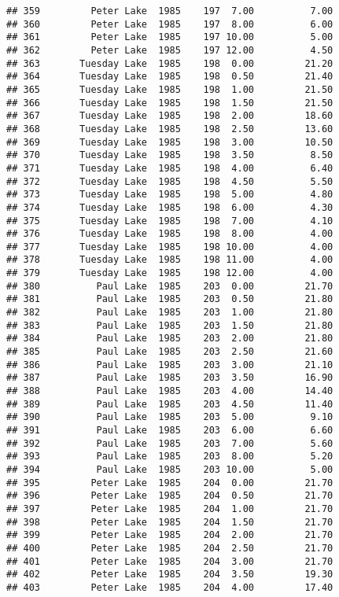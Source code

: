 \documentclass[
]{article}
\begin{document}
\begin{verbatim}
## 359         Peter Lake  1985    197  7.00          7.00
## 360         Peter Lake  1985    197  8.00          6.00
## 361         Peter Lake  1985    197 10.00          5.00
## 362         Peter Lake  1985    197 12.00          4.50
## 363       Tuesday Lake  1985    198  0.00         21.20
## 364       Tuesday Lake  1985    198  0.50         21.40
## 365       Tuesday Lake  1985    198  1.00         21.50
## 366       Tuesday Lake  1985    198  1.50         21.50
## 367       Tuesday Lake  1985    198  2.00         18.60
## 368       Tuesday Lake  1985    198  2.50         13.60
## 369       Tuesday Lake  1985    198  3.00         10.50
## 370       Tuesday Lake  1985    198  3.50          8.50
## 371       Tuesday Lake  1985    198  4.00          6.40
## 372       Tuesday Lake  1985    198  4.50          5.50
## 373       Tuesday Lake  1985    198  5.00          4.80
## 374       Tuesday Lake  1985    198  6.00          4.30
## 375       Tuesday Lake  1985    198  7.00          4.10
## 376       Tuesday Lake  1985    198  8.00          4.00
## 377       Tuesday Lake  1985    198 10.00          4.00
## 378       Tuesday Lake  1985    198 11.00          4.00
## 379       Tuesday Lake  1985    198 12.00          4.00
## 380          Paul Lake  1985    203  0.00         21.70
## 381          Paul Lake  1985    203  0.50         21.80
## 382          Paul Lake  1985    203  1.00         21.80
## 383          Paul Lake  1985    203  1.50         21.80
## 384          Paul Lake  1985    203  2.00         21.80
## 385          Paul Lake  1985    203  2.50         21.60
## 386          Paul Lake  1985    203  3.00         21.10
## 387          Paul Lake  1985    203  3.50         16.90
## 388          Paul Lake  1985    203  4.00         14.40
## 389          Paul Lake  1985    203  4.50         11.40
## 390          Paul Lake  1985    203  5.00          9.10
## 391          Paul Lake  1985    203  6.00          6.60
## 392          Paul Lake  1985    203  7.00          5.60
## 393          Paul Lake  1985    203  8.00          5.20
## 394          Paul Lake  1985    203 10.00          5.00
## 395         Peter Lake  1985    204  0.00         21.70
## 396         Peter Lake  1985    204  0.50         21.70
## 397         Peter Lake  1985    204  1.00         21.70
## 398         Peter Lake  1985    204  1.50         21.70
## 399         Peter Lake  1985    204  2.00         21.70
## 400         Peter Lake  1985    204  2.50         21.70
## 401         Peter Lake  1985    204  3.00         21.70
## 402         Peter Lake  1985    204  3.50         19.30
## 403         Peter Lake  1985    204  4.00         17.40

\end{verbatim}
\end{document}
